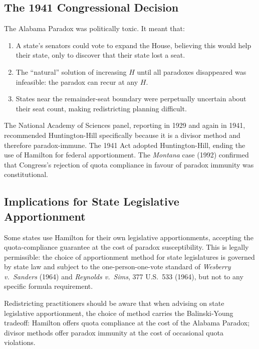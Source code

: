 \label{sec:consequences}

\subsection{The 1941 Congressional Decision}

The Alabama Paradox was politically toxic.
It meant that:
\begin{enumerate}
  \item A state's senators could vote to expand the House,
    believing this would help their state, only to discover that
    their state lost a seat.
  \item The ``natural'' solution of increasing $H$ until all paradoxes
    disappeared was infeasible: the paradox can recur at any $H$.
  \item States near the remainder-seat boundary were perpetually
    uncertain about their seat count, making redistricting planning
    difficult.
\end{enumerate}

The National Academy of Sciences panel, reporting in 1929 and again
in 1941, recommended Huntington-Hill specifically because it is
a divisor method and therefore paradox-immune.
The 1941 Act adopted Huntington-Hill, ending the use of Hamilton
for federal apportionment.
The \textit{Montana} case (1992) confirmed that Congress's rejection
of quota compliance in favour of paradox immunity was constitutional.

\subsection{Implications for State Legislative Apportionment}

Some states use Hamilton for their own legislative apportionments,
accepting the quota-compliance guarantee at the cost of paradox
susceptibility.
This is legally permissible: the choice of apportionment method for
state legislatures is governed by state law and subject to the
one-person-one-vote standard of \textit{Wesberry v.\ Sanders} (1964)
and \textit{Reynolds v.\ Sims}, 377 U.S.\ 533 (1964),
but not to any specific formula requirement.

Redistricting practitioners should be aware that when advising on
state legislative apportionment, the choice of method carries
the Balinski-Young tradeoff: Hamilton offers quota compliance
at the cost of the Alabama Paradox; divisor methods offer
paradox immunity at the cost of occasional quota violations.

